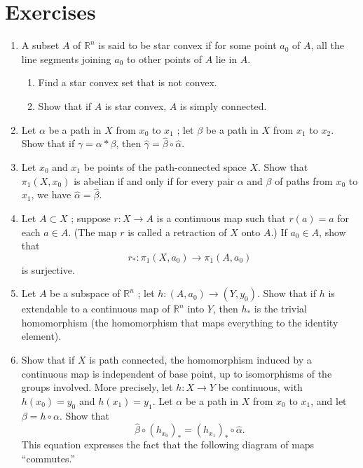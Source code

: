 \section*{Exercises}
\begin{enumerate}[itemsep=0.4em, parsep=0pt, topsep=0pt, partopsep=0pt, leftmargin=*, label=\arabic*., ref=\arabic*]
\item A subset \(A\) of \(\mathbb{R}^{n}\) is said to be star convex if for some point \(a_{0}\) of \(A\), all the line segments joining \(a_{0}\) to other points of \(A\) lie in \(A\).
 \begin{enumerate}[itemsep=0.2em, parsep=0pt, topsep=0pt, partopsep=0pt, leftmargin=*, label=(\alph*), align=left]
 \item Find a star convex set that is not convex.
 \item Show that if \(A\) is star convex, \(A\) is simply connected.
 \end{enumerate}
\item Let \(\alpha\) be a path in \(X\) from \(x_{0}\) to \(x_{1}\) ; let \(\beta\) be a path in \(X\) from \(x_{1}\) to \(x_{2}\). Show that if \(\gamma = \alpha * \beta\), then \(\hat{\gamma } = \hat{\beta } \circ \hat{\alpha }\).
\item Let \(x_{0}\) and \(x_{1}\) be points of the path-connected space \(X\). Show that \({\pi }_{1}( {X,x_{0}})\) is abelian if and only if for every pair \(\alpha\) and \(\beta\) of paths from \(x_{0}\) to \(x_{1}\), we have \(\hat{\alpha } = \hat{\beta }\).
\item Let \(A \subset X\) ; suppose \(r : X \rightarrow A\) is a continuous map such that \(r( a) = a\) for each \(a \in A\). (The map \(r\) is called a retraction of \(X\) onto \(A\).) If \(a_{0} \in A\), show that \[ r_{ * } : {\pi }_{1}( {X,a_{0}}) \rightarrow {\pi }_{1}( {A,a_{0}}) \] is surjective.
\item Let \(A\) be a subspace of \(\mathbb{R}^{n}\) ; let \(h : ( {A,a_{0}}) \rightarrow ( {Y,y_{0}})\). Show that if \(h\) is extendable to a continuous map of \(\mathbb{R}^{n}\) into \(Y\), then \(h_{ * }\) is the trivial homomorphism (the homomorphism that maps everything to the identity element).
\item Show that if \(X\) is path connected, the homomorphism induced by a continuous map is independent of base point, up to isomorphisms of the groups involved. More precisely, let \(h : X \rightarrow Y\) be continuous, with \(h( x_{0}) = y_{0}\) and \(h( x_{1}) = y_{1}\). Let \(\alpha\) be a path in \(X\) from \(x_{0}\) to \(x_{1}\), and let \(\beta = h \circ \alpha\). Show that \[ \hat{\beta } \circ {( h_{x_{0}}) }_{ * } = {( h_{x_{1}}) }_{ * } \circ \hat{\alpha }. \] This equation expresses the fact that the following diagram of maps ``commutes.'' %

\end{enumerate}
